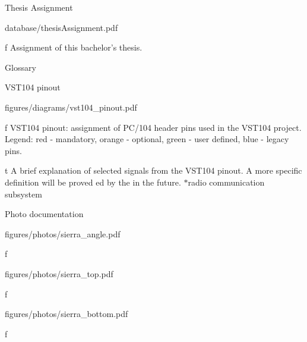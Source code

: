 

\app Thesis Assignment

\midinsert
    \hsize \cinspic database/thesisAssignment.pdf
    \caption/f Assignment of this bachelor's thesis.
\endinsert




\app Glossary
\makeglos




\app VST104 pinout

\midinsert
    \hsize \cinspic figures/diagrams/vst104_pinout.pdf
    \caption/f VST104 pinout: assignment of PC/104 header pins used in the VST104 project. Legend: red - mandatory, orange - optional, green - user defined, blue - legacy pins.
\endinsert

\midinsert {}
    \caption/t A brief explanation of selected signals from the VST104 pinout. A more specific definition will be proved ed by the  in the future. $*$radio communication subsystem
\endinsert




\app Photo documentation

\midinsert
    \hsize \cinspic figures/photos/sierra_angle.pdf
    \caption/f 
\endinsert

\midinsert
    \picw=90.17mm \cinspic figures/photos/sierra_top.pdf
    \caption/f 
\endinsert

\midinsert
    \picw=90.17mm\cinspic figures/photos/sierra_bottom.pdf
    \caption/f 
\endinsert

